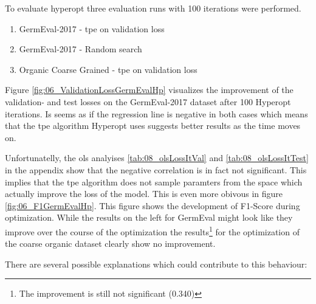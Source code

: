 To evaluate hyperopt three evaluation runs with 100 iterations were performed.

\begin{enumerate}
	\item GermEval-2017 - \gls{tpe} on validation loss
	\item GermEval-2017 - Random search
	\item Organic Coarse Grained - \gls{tpe} on validation loss
\end{enumerate}

Figure \ref{fig:06_ValidationLossGermEvalHp} visualizes the improvement of the validation- and test losses on the GermEval-2017 dataset after 100 Hyperopt iterations. Is seems as if the regression line is negative in both cases which means that the \gls{tpe} algorithm Hyperopt uses suggests better results as the time moves on.

Unfortunatelly, the \gls{ols} analyises \ref{tab:08_olsLossItVal} and \ref{tab:08_olsLossItTest} in the appendix show that the negative correlation is in fact not significant. This implies that the \gls{tpe} algorithm does not sample paramters from the space which actually improve the loss of the model. This is even more obivous in figure \ref{fig:06_F1GermEvalHp}. This figure shows the development of F1-Score during optimization. While the results on the left for GermEval might look like they improve over the course of the optimization the results\footnote{The improvement is still not significant {(0.340)}} for the optimization of the coarse organic dataset clearly show no improvement.
\medskip

There are several possible explanations which could contribute to this behaviour:

